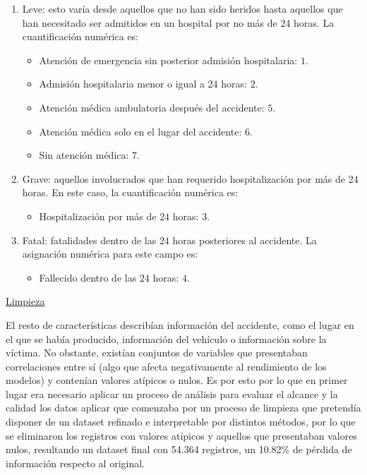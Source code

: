 \documentclass{uathesis-es}
\begin{document}
\begin{enumerate}
	\item Leve: esto varía desde aquellos que no han sido heridos hasta aquellos que han necesitado ser admitidos en un hospital por no más de 24 horas. La cuantificación numérica es:
	\begin{itemize}
		\item Atención de emergencia sin posterior admisión hospitalaria: $1$.
		\item Admisión hospitalaria menor o igual a 24 horas: $2$.
		\item Atención médica ambulatoria después del accidente: $5$.
		\item Atención médica solo en el lugar del accidente: $6$.
		\item Sin atención médica: $7$.
	\end{itemize}
	\item Grave: aquellos involucrados que han requerido hospitalización por más de 24 horas. En este caso, la cuantificación numérica es:
	\begin{itemize}
		\item Hospitalización por más de $24$ horas: $3$.
	\end{itemize}
	\item Fatal: fatalidades dentro de las $24$ horas posteriores al accidente. La asignación numérica para este campo es:
	\begin{itemize}
		\item Fallecido dentro de las $24$ horas: $4$.
	\end{itemize}
\end{enumerate}

\underline{Limpieza}
	
El resto de características describían información del accidente, como el lugar en el que se había producido, información del vehículo o información sobre la víctima. No obstante, existían conjuntos de variables que presentaban correlaciones entre sí (algo que afecta negativamente al rendimiento de los modelos) y contenían valores atípicos o nulos. Es por esto por lo que en primer lugar era necesario aplicar un proceso de análisis para evaluar el alcance y la calidad los datos aplicar que comenzaba por un proceso de limpieza que pretendía disponer de un dataset refinado e interpretable por distintos métodos, por lo que se eliminaron los registros con valores atípicos y aquellos que presentaban valores nulos, resultando un dataset final con 54.364 registros, un 10.82\% de pérdida de información respecto al original.
\end{document}
